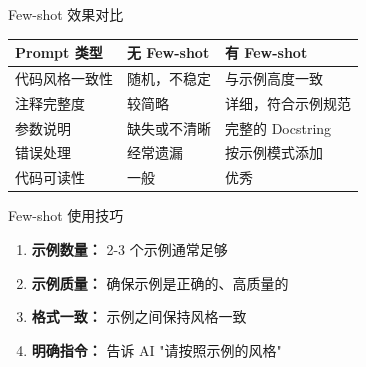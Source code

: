 \begin{frame}{Few-shot 效果对比}
	\begin{table}
		\centering
		\begin{tabular}{p{3cm}p{5cm}p{5cm}}
			\toprule
			\textbf{Prompt 类型} & \textbf{无 Few-shot} & \textbf{有 Few-shot} \\
			\midrule
			代码风格一致性            & 随机，不稳定              & 与示例高度一致             \\
			注释完整度              & 较简略                 & 详细，符合示例规范           \\
			参数说明               & 缺失或不清晰              & 完整的 Docstring       \\
			错误处理               & 经常遗漏                & 按示例模式添加             \\
			代码可读性              & 一般                  & 优秀                  \\
			\bottomrule
		\end{tabular}
	\end{table}

	\vspace{0.3cm}

	\begin{block}{Few-shot 使用技巧}
		\begin{enumerate}
			\item \textbf{示例数量：} 2-3 个示例通常足够
			\item \textbf{示例质量：} 确保示例是正确的、高质量的
			\item \textbf{格式一致：} 示例之间保持风格一致
			\item \textbf{明确指令：} 告诉 AI "请按照示例的风格"
		\end{enumerate}
	\end{block}
\end{frame}


